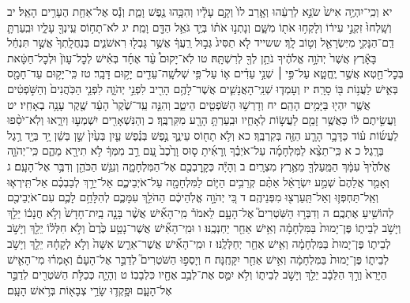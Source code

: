 \documentclass[twoside, openany, parskip=half, 11pt]{book}
\begin{document}
יא וְכִֽי־יִהְיֶ֥ה אִישׁ֙ שֹׂנֵ֣א לְרֵעֵ֔הוּ וְאָ֤רַב לוֹ֙ וְקָ֣ם עָלָ֔יו וְהִכָּ֥הוּ נֶ֖פֶשׁ וָמֵ֑ת וְנָ֕ס אֶל־אַחַ֖ת הֶעָרִ֥ים הָאֵֽל׃ יב וְשָֽׁלְחוּ֙ זִקְנֵ֣י עִיר֔וֹ וְלָקְח֥וּ אֹת֖וֹ מִשָּׁ֑ם וְנָתְנ֣וּ אֹת֗וֹ בְּיַ֛ד גֹּאֵ֥ל הַדָּ֖ם וָמֵֽת׃ יג לֹא־תָח֥וֹס עֵֽינְךָ֖ עָלָ֑יו וּבִֽעַרְתָּ֧ דַֽם־הַנָּקִ֛י מִיִּשְׂרָאֵ֖ל וְט֥וֹב לָֽךְ׃
ששייד לֹ֤א תַסִּיג֙ גְּב֣וּל רֵֽעֲךָ֔ אֲשֶׁ֥ר גָּבְל֖וּ רִאשֹׁנִ֑ים בְּנַחֲלָֽתְךָ֙ אֲשֶׁ֣ר תִּנְחַ֔ל בָּאָ֕רֶץ אֲשֶׁר֙ יְהֹוָ֣ה אֱלֹהֶ֔יךָ נֹתֵ֥ן לְךָ֖ לְרִשְׁתָּֽהּ׃
טו לֹֽא־יָקוּם֩ עֵ֨ד אֶחָ֜ד בְּאִ֗ישׁ לְכׇל־עָוֺן֙ וּלְכׇל־חַטָּ֔את בְּכׇל־חֵ֖טְא אֲשֶׁ֣ר יֶֽחֱטָ֑א עַל־פִּ֣י ׀ שְׁנֵ֣י עֵדִ֗ים א֛וֹ עַל־פִּ֥י שְׁלֹשָֽׁה־עֵדִ֖ים יָק֥וּם דָּבָֽר׃ טז כִּֽי־יָק֥וּם עֵד־חָמָ֖ס בְּאִ֑ישׁ לַעֲנ֥וֹת בּ֖וֹ סָרָֽה׃ יז וְעָמְד֧וּ שְׁנֵֽי־הָאֲנָשִׁ֛ים אֲשֶׁר־לָהֶ֥ם הָרִ֖יב לִפְנֵ֣י יְהֹוָ֑ה לִפְנֵ֤י הַכֹּֽהֲנִים֙ וְהַשֹּׁ֣פְטִ֔ים אֲשֶׁ֥ר יִהְי֖וּ בַּיָּמִ֥ים הָהֵֽם׃ יח וְדָרְשׁ֥וּ הַשֹּׁפְטִ֖ים הֵיטֵ֑ב וְהִנֵּ֤ה עֵֽד־שֶׁ֙קֶר֙ הָעֵ֔ד שֶׁ֖קֶר עָנָ֥ה בְאָחִֽיו׃ יט וַעֲשִׂ֣יתֶם ל֔וֹ כַּאֲשֶׁ֥ר זָמַ֖ם לַעֲשׂ֣וֹת לְאָחִ֑יו וּבִֽעַרְתָּ֥ הָרָ֖ע מִקִּרְבֶּֽךָ׃ כ וְהַנִּשְׁאָרִ֖ים יִשְׁמְע֣וּ וְיִרָ֑אוּ וְלֹֽא־יֹסִ֨פוּ לַעֲשׂ֜וֹת ע֗וֹד כַּדָּבָ֥ר הָרָ֛ע הַזֶּ֖ה בְּקִרְבֶּֽךָ׃ כא וְלֹ֥א תָח֖וֹס עֵינֶ֑ךָ נֶ֣פֶשׁ בְּנֶ֗פֶשׁ עַ֤יִן בְּעַ֙יִן֙ שֵׁ֣ן בְּשֵׁ֔ן יָ֥ד בְּיָ֖ד רֶ֥גֶל בְּרָֽגֶל׃
כ א כִּֽי־תֵצֵ֨א לַמִּלְחָמָ֜ה עַל־אֹיְבֶ֗ךָ וְֽרָאִ֜יתָ ס֤וּס וָרֶ֙כֶב֙ עַ֚ם רַ֣ב מִמְּךָ֔ לֹ֥א תִירָ֖א מֵהֶ֑ם כִּֽי־יְהֹוָ֤ה אֱלֹהֶ֙יךָ֙ עִמָּ֔ךְ הַמַּֽעַלְךָ֖ מֵאֶ֥רֶץ מִצְרָֽיִם׃ ב וְהָיָ֕ה כְּקָֽרׇבְכֶ֖ם אֶל־הַמִּלְחָמָ֑ה וְנִגַּ֥שׁ הַכֹּהֵ֖ן וְדִבֶּ֥ר אֶל־הָעָֽם׃ ג וְאָמַ֤ר אֲלֵהֶם֙ שְׁמַ֣ע יִשְׂרָאֵ֔ל אַתֶּ֨ם קְרֵבִ֥ים הַיּ֛וֹם לַמִּלְחָמָ֖ה עַל־אֹיְבֵיכֶ֑ם אַל־יֵרַ֣ךְ לְבַבְכֶ֗ם אַל־תִּֽירְא֧וּ וְאַֽל־תַּחְפְּז֛וּ וְאַל־תַּֽעַרְצ֖וּ מִפְּנֵיהֶֽם׃ ד כִּ֚י יְהֹוָ֣ה אֱלֹֽהֵיכֶ֔ם הַהֹלֵ֖ךְ עִמָּכֶ֑ם לְהִלָּחֵ֥ם לָכֶ֛ם עִם־אֹיְבֵיכֶ֖ם לְהוֹשִׁ֥יעַ אֶתְכֶֽם׃ ה וְדִבְּר֣וּ הַשֹּֽׁטְרִים֮ אֶל־הָעָ֣ם לֵאמֹר֒ מִֽי־הָאִ֞ישׁ אֲשֶׁ֨ר בָּנָ֤ה בַֽיִת־חָדָשׁ֙ וְלֹ֣א חֲנָכ֔וֹ יֵלֵ֖ךְ וְיָשֹׁ֣ב לְבֵית֑וֹ פֶּן־יָמוּת֙ בַּמִּלְחָמָ֔ה וְאִ֥ישׁ אַחֵ֖ר יַחְנְכֶֽנּוּ׃ ו וּמִֽי־הָאִ֞ישׁ אֲשֶׁר־נָטַ֥ע כֶּ֙רֶם֙ וְלֹ֣א חִלְּל֔וֹ יֵלֵ֖ךְ וְיָשֹׁ֣ב לְבֵית֑וֹ פֶּן־יָמוּת֙ בַּמִּלְחָמָ֔ה וְאִ֥ישׁ אַחֵ֖ר יְחַלְּלֶֽנּוּ׃ ז וּמִֽי־הָאִ֞ישׁ אֲשֶׁר־אֵרַ֤שׂ אִשָּׁה֙ וְלֹ֣א לְקָחָ֔הּ יֵלֵ֖ךְ וְיָשֹׁ֣ב לְבֵית֑וֹ פֶּן־יָמוּת֙ בַּמִּלְחָמָ֔ה וְאִ֥ישׁ אַחֵ֖ר יִקָּחֶֽנָּה׃ ח וְיָסְפ֣וּ הַשֹּׁטְרִים֮ לְדַבֵּ֣ר אֶל־הָעָם֒ וְאָמְר֗וּ מִי־הָאִ֤ישׁ הַיָּרֵא֙ וְרַ֣ךְ הַלֵּבָ֔ב יֵלֵ֖ךְ וְיָשֹׁ֣ב לְבֵית֑וֹ וְלֹ֥א יִמַּ֛ס אֶת־לְבַ֥ב אֶחָ֖יו כִּלְבָבֽוֹ׃ ט וְהָיָ֛ה כְּכַלֹּ֥ת הַשֹּׁטְרִ֖ים לְדַבֵּ֣ר אֶל־הָעָ֑ם וּפָ֥קְד֛וּ שָׂרֵ֥י צְבָא֖וֹת בְּרֹ֥אשׁ הָעָֽם׃
\end{document}
